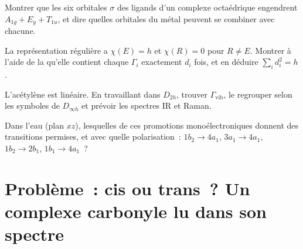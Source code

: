 \begin{exercise}[$\star\star$]\label{exo:b3:group-theory-applied:9}
Montrer que les six orbitales $\sigma$ des ligands d'un complexe
octaédrique engendrent
$A_{1g} + E_g + T_{1u}$, et dire quelles orbitales du métal peuvent se
combiner avec chacune.
\end{exercise}

\begin{exercise}[$\star\star\star$]\label{exo:b3:group-theory-applied:10}
La représentation régulière a $\chi(E) = h$ et $\chi(R) = 0$ pour
$R \ne E$. Montrer
à l'aide de la  qu'elle contient chaque
 $\Gamma_i$ exactement $d_i$ fois, et en
déduire $\sum_id_i^2 = h$.
\end{exercise}

\begin{exercise}[$\star\star\star$]\label{exo:b3:group-theory-applied:11}
L'acétylène  est linéaire. En travaillant dans $D_{2h}$,
trouver $\Gamma_{\mathrm{vib}}$, le regrouper selon les symboles de
$D_{\infty h}$ et prévoir les spectres IR et Raman.
\end{exercise}

\begin{exercise}[$\star\star\star$]\label{exo:b3:group-theory-applied:12}
Dans l'eau (plan $xz$), lesquelles de ces promotions monoélectroniques
donnent des transitions permises, et avec quelle polarisation~:
$1b_2 \to 4a_1$, $3a_1 \to 4a_1$,
$1b_2 \to 2b_1$, $1b_1 \to 4a_1$~?
\end{exercise}

\section{Problème~: cis ou trans~? Un complexe carbonyle lu dans son spectre}

